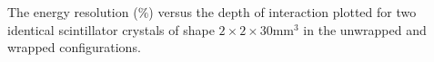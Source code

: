 \label{fig:energyresolution} The energy resolution ($\%$) versus the depth of interaction plotted for two identical scintillator crystals of shape $2\times2\times30$mm$^3$ in the unwrapped and wrapped configurations.